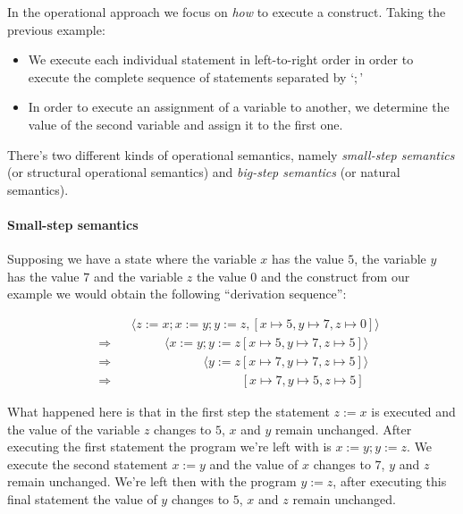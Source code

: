 In the operational approach we focus on \textit{how} to execute a construct.
Taking the previous example:

\begin{itemize}
\item{We execute each individual statement in left-to-right order in order to execute the complete sequence of statements separated by `$;$'}
\item{In order to execute an assignment of a variable to another, we determine the value of the second variable and assign it to the first one.}
\end{itemize}

There's two different kinds of operational semantics, namely \textit{small-step semantics} (or structural operational semantics) and \textit{big-step semantics} (or natural semantics).

\paragraph{Small-step semantics}

Supposing we have a state where the variable $x$ has the value $5$, the variable $y$ has the value $7$ and the variable $z$ the value $0$ and the construct from our example we would obtain the following \enquote{derivation sequence}:

\begin{equation*}
\begin{split}
& \phantom{\Rightarrow} \phantom{=} \langle z:=x; x:=y; y:=z, [x\mapsto5, y\mapsto7, z\mapsto0]\rangle\\
& \Rightarrow \phantom{=} \phantom{z:=x} \langle x:=y; y:=z [x\mapsto5, y\mapsto7, z\mapsto5]\rangle\\
& \Rightarrow \phantom{=} \phantom{z:=x; x:=y} \langle y:=z [x\mapsto7, y\mapsto7, z\mapsto5]\rangle\\
& \Rightarrow \phantom{=} \phantom{z:=x; x:=y; y:=z} [x\mapsto7, y\mapsto5, z\mapsto5]
\end{split}
\end{equation*}

What happened here is that in the first step the statement $z:=x$ is executed and the value of the variable $z$ changes to $5$, $x$ and $y$ remain unchanged.
After executing the first statement the program we're left with is $x:=y; y:=z$.
We execute the second statement $x:=y$ and the value of $x$ changes to $7$, $y$ and $z$ remain unchanged.
We're left then with the program $y:=z$, after executing this final statement the value of $y$ changes to $5$, $x$ and $z$ remain unchanged.

